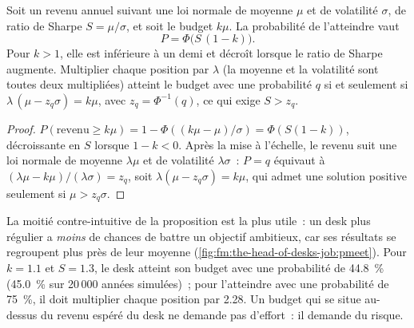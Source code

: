 \begin{proposition}\label{prop:fm:the-head-of-desks-job:target}
Soit un revenu annuel suivant une loi normale de moyenne $\mu$ et de volatilité $\sigma$, de ratio de Sharpe $S=\mu/\sigma$, et soit le budget $k\mu$. La probabilité
de l'atteindre vaut
\[
P=\Phi\bigl(S\,(1-k)\bigr).
\]
Pour $k>1$, elle est inférieure à un demi et décroît lorsque le ratio de Sharpe augmente. Multiplier chaque position par $\lambda$ (la moyenne et la volatilité sont toutes deux multipliées) atteint le
budget avec une probabilité $q$ si et seulement si $\lambda\,(\mu-z_q\sigma)=k\mu$, avec $z_q=\Phi^{-1}(q)$, ce qui exige $S>z_q$.
\end{proposition}

\begin{proof}
$P(\text{revenu}\ge k\mu)=1-\Phi((k\mu-\mu)/\sigma)=\Phi(S(1-k))$, décroissante en $S$ lorsque $1-k<0$. Après la mise à l'échelle, le revenu suit une loi normale de moyenne
$\lambda\mu$ et de volatilité $\lambda\sigma$~: $P=q$ équivaut à $(\lambda\mu-k\mu)/(\lambda\sigma)=z_q$, soit $\lambda(\mu-z_q\sigma)=k\mu$, qui admet une
solution positive seulement si $\mu>z_q\sigma$.
\end{proof}

La moitié contre-intuitive de la proposition est la plus utile~: un desk plus régulier a \emph{moins} de chances de battre un objectif ambitieux, car ses
résultats se regroupent plus près de leur moyenne (\cref{fig:fm:the-head-of-desks-job:pmeet}). Pour $k=1.1$ et $S=1.3$, le desk atteint son budget avec
une probabilité de 44.8~\% (45.0~\% sur 20\,000 années simulées)~; pour l'atteindre avec une probabilité de 75~\%, il doit multiplier chaque position par 2.28. Un budget qui se situe
au-dessus du revenu espéré du desk ne demande pas d'effort~: il demande du risque.

